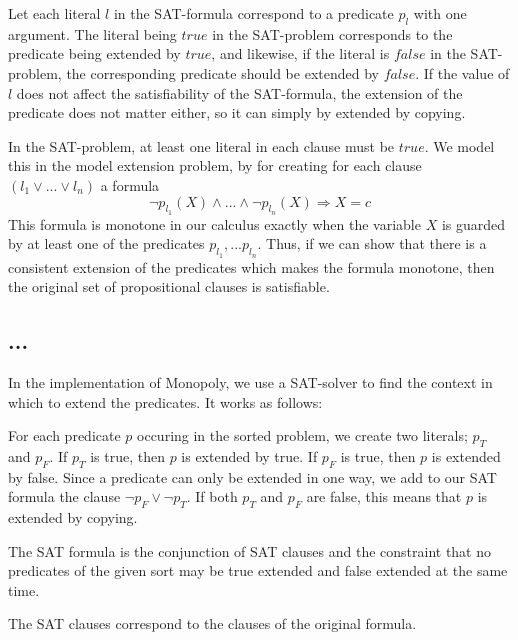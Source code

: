   Let each literal $l$ in the SAT-formula correspond to a predicate $p_l$ with one argument.
  The literal being $true$ in the SAT-problem corresponds to the predicate
  being extended by $true$, and likewise, if the literal is $false$ in the SAT-
  problem, the corresponding predicate should be extended by $false$. If the value of $l$ does
  not affect the satisfiability of the SAT-formula, the extension of the predicate does not
  matter either, so it can simply by extended by copying.

  In the SAT-problem, at least one literal in each clause must be $true$.
  We model this in the model extension problem, by for creating for each clause $(l_1 \vee ...\vee l_n)$ a formula
  $$ \neg p_{l_1}(X) \wedge ... \wedge \neg p_{l_n}(X) \Rightarrow X = c $$
  This formula is monotone in our calculus exactly when the variable $X$ 
  is guarded by at least one of the predicates $p_{l_1},...p_{l_n}$.
  Thus, if we can show that there is a consistent extension of the predicates
  which makes the formula monotone, then the original set of propositional 
  clauses is satisfiable.


\subsection{...}

  In the implementation of Monopoly, we use a SAT-solver to find the context 
  in which to extend the predicates. It works as follows:

  For each predicate $p$ occuring in the sorted problem, we create two literals;
  $p_T$ and $p_F$. If $p_T$ is true, then $p$  is extended by true. 
  If $p_F$ is true, then $p$ is extended by false. Since a predicate can only
  be extended in one way, we add to our SAT formula the clause $\neg p_F \vee \neg p_T$.
  If both $p_T$ and $p_F$ are false, this means that $p$ is extended by copying.

  The SAT formula is the conjunction of SAT clauses and the constraint that no 
  predicates of the given sort may be true extended and false extended at the same time.

  The SAT clauses correspond to the clauses of the original formula.

